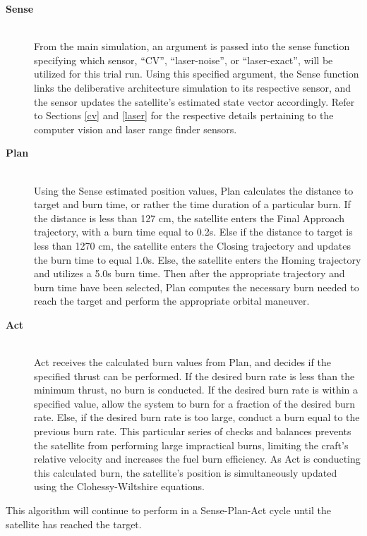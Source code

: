 \documentclass[journal, 10pt]{IEEEtran}
\begin{document}
\begin{description}
\item[\textbf{Sense}] \hfill \\
From the main simulation, an argument is passed into the sense function specifying which sensor, ``CV'', ``laser-noise'', or ``laser-exact'', will be utilized for this trial run. Using this specified argument, the Sense function links the deliberative architecture simulation to its respective sensor, and the sensor updates the satellite's estimated state vector accordingly. Refer to Sections \ref{cv} and \ref{laser} for the respective details pertaining to the computer vision and laser range finder sensors.

\item[\textbf{Plan}] \hfill \\
Using the Sense estimated position values, Plan calculates the distance to target and burn time, or rather the time duration of a particular burn. If the distance is less than 127 cm, the satellite enters the Final Approach trajectory, with a burn time equal to 0.2s. Else if the distance to target is less than 1270 cm, the satellite enters the Closing trajectory and updates the burn time to equal 1.0s. Else, the satellite enters the Homing trajectory and utilizes a 5.0s burn time. Then after the appropriate trajectory and burn time have been selected, Plan computes the necessary burn needed to reach the target and perform the appropriate orbital maneuver.

\item[\textbf{Act}] \hfill \\
Act receives the calculated burn values from Plan, and decides if the specified thrust can be performed. If the desired burn rate is less than the minimum thrust, no burn is conducted. If the desired burn rate is within a specified value, allow the system to burn for a fraction of the desired burn rate. Else, if the desired burn rate is too large, conduct a burn equal to the previous burn rate. This particular series of checks and balances prevents the satellite from performing large impractical burns, limiting the craft's relative velocity and increases the fuel burn efficiency. As Act is conducting this calculated burn, the satellite's position is simultaneously updated using the Clohessy-Wiltshire equations.
\end{description}

This algorithm will continue to perform in a Sense-Plan-Act cycle until the satellite has reached the target.
\end{document}
